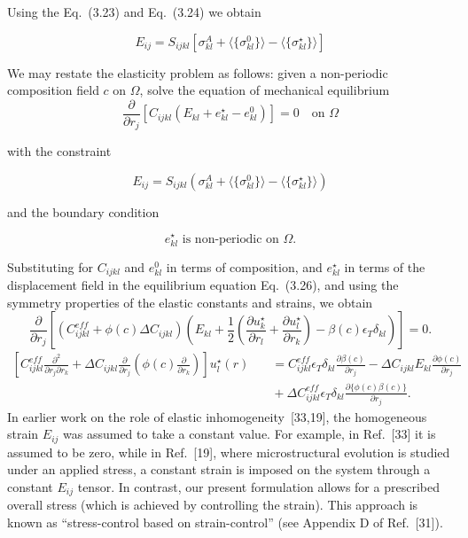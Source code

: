 Using the Eq.~(3.23) and Eq.~(3.24) we obtain

\begin{equation}
E_{ij}=S_{ijkl}[\sigma^A_{kl}+\langle\{\sigma^0_{kl}\}\rangle-\langle\{\sigma^{\star}_{kl}\}\rangle]
\end{equation}

We may restate the elasticity problem as follows: given a non-periodic composition field $c$ on $\Omega$, solve the equation of mechanical equilibrium
\begin{equation}
\frac{\partial}{\partial r_j}\left[C_{ijkl}\left(E_{kl}+e^{\star}_{kl}-e^0_{kl}\right)\right]=0 \quad\text{on } \Omega
\end{equation}

with the constraint

\begin{equation}
E_{ij}=S_{ijkl}\left(\sigma^A_{kl}+\langle\{\sigma^0_{kl}\}\rangle-\langle\{\sigma^{\star}_{kl}\}\rangle\right)
\end{equation}

and the boundary condition

\begin{equation}
e^{\star}_{kl}\text{ is non-periodic on } \Omega.
\end{equation}

Substituting for $C_{ijkl}$ and $e^0_{kl}$ in terms of composition, and $e^{\star}_{kl}$ in terms of the displacement field in the equilibrium equation Eq.~(3.26), and using the symmetry properties of the elastic constants and strains, we obtain
\begin{equation}
\frac{\partial}{\partial r_j}\left[\left(C_{ijkl}^{eff}+\phi(c)\Delta C_{ijkl}\right)\left(E_{kl}+\frac{1}{2}\left(\frac{\partial u^{\star}_k}{\partial r_l}+\frac{\partial u^{\star}_l}{\partial r_k}\right)-\beta(c)\epsilon_T\delta_{kl}\right)\right]=0.
\end{equation}
\begin{equation}
\begin{split}
\left[ C_{ijkl}^{eff}\frac{\partial^2}{\partial r_j \partial r_k} + \Delta C_{ijkl}\frac{\partial}{\partial r_j}\left(\phi(c)\frac{\partial}{\partial r_k}\right) \right] u^{\star}_l(r)
&\quad =C_{ijkl}^{eff}\epsilon_T\delta_{kl}\frac{\partial\beta(c)}{\partial r_j} - \Delta C_{ijkl}E_{kl}\frac{\partial\phi(c)}{\partial r_j} \\
&\quad + \Delta C_{ijkl}^{eff}\epsilon_T\delta_{kl}\frac{\partial\{\phi(c)\beta(c)\}}{\partial r_j}.
\end{split}
\end{equation}
In earlier work on the role of elastic inhomogeneity~[33,19], the homogeneous strain $E_{ij}$ was assumed to take a constant value. For example, in Ref.~[33] it is assumed to be zero, while in Ref.~[19], where microstructural evolution is studied under an applied stress, a constant strain is imposed on the system through a constant $E_{ij}$ tensor. In contrast, our present formulation allows for a prescribed overall stress (which is achieved by controlling the strain). This approach is known as ``stress-control based on strain-control'' (see Appendix D of Ref.~[31]).
